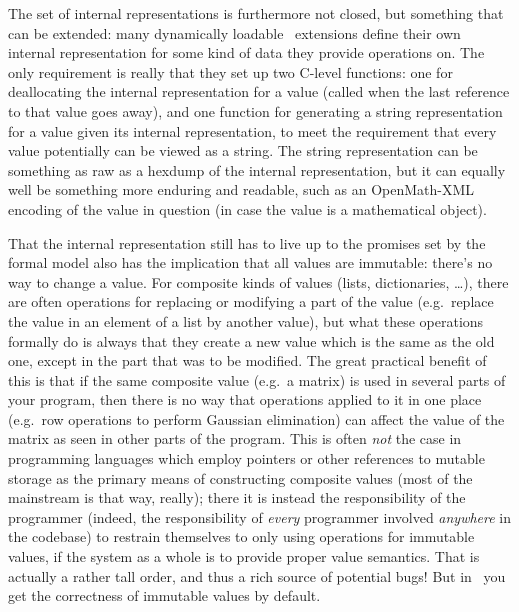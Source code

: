 \documentclass{mtmtcl}
\theoremstyle{plain}
\theoremstyle{remark}
\begin{document}
The set of internal representations is furthermore not closed, but 
something that can be extended: many dynamically loadable \Tcl\ 
extensions define their own internal representation for some kind of 
data they provide operations on. The only requirement is really that 
they set up two C-level functions: one for deallocating the internal 
representation for a value (called when the last reference to that 
value goes away), and one function for generating a string 
representation for a value given its internal representation, to meet 
the requirement that every value potentially can be viewed as a string. 
The string representation can be something as raw as a hexdump of the 
internal representation, but it can equally well be something more 
enduring and readable, such as an OpenMath-XML encoding of the value 
in question (in case the value is a mathematical object). 

That the internal representation still has to live up to the promises 
set by the formal model also has the implication that all values are 
immutable: there's no way to change a value. For composite kinds of 
values (lists, dictionaries, \dots), there are often operations for 
replacing or modifying a part of the value (e.g.~replace the value in 
an element of a list by another value), but what these operations 
formally do is always that they create a new value which is the same 
as the old one, except in the part that was to be modified. The great 
practical benefit of this is that if the same composite value (e.g.~a 
matrix) is used in several parts of your program, then there is no 
way that operations applied to it in one place (e.g.~row operations 
to perform Gaussian elimination) can affect the value of the matrix 
as seen in other parts of the program. This is often \emph{not} the 
case in programming languages which employ pointers or other references 
to mutable storage as the primary means of constructing composite 
values (most of the mainstream is that way, really); there it is 
instead the responsibility of the programmer (indeed, the responsibility 
of \emph{every} programmer involved \emph{anywhere} in the codebase) to 
restrain themselves to only using operations for immutable values, if 
the system as a whole is to provide proper value semantics. That is 
actually a rather tall order, and thus a rich source of potential 
bugs! But in \Tcl\ you get the correctness of immutable values by 
default.
\end{document}
